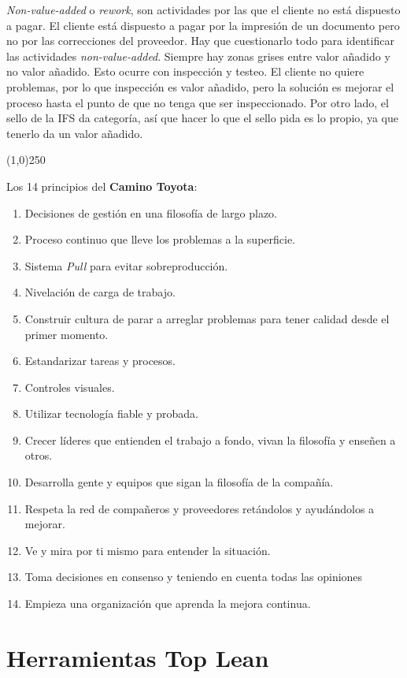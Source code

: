 \documentclass[oneside]{book}
\begin{document}
\textit{Non-value-added} o \textit{rework}, son actividades por las que el cliente no está dispuesto a pagar. El cliente está dispuesto a pagar por la impresión de un documento pero no por las correcciones del proveedor. Hay que cuestionarlo todo para identificar las actividades \textit{non-value-added}. Siempre hay zonas grises entre valor añadido y no valor añadido. Esto ocurre con inspección y testeo. El cliente no quiere problemas, por lo que inspección es valor añadido, pero la solución es mejorar el proceso hasta el punto de que no tenga que ser inspeccionado. Por otro lado, el sello de la IFS da categoría, así que hacer lo que el sello pida es lo propio, ya que tenerlo da un valor añadido.
\begin{center}
	\line(1,0){250}
\end{center}
Los 14 principios del \textbf{Camino Toyota}: \begin{enumerate} \item Decisiones de gestión en una filosofía de largo plazo. \item Proceso continuo que lleve los problemas a la superficie. \item Sistema \textit{Pull} para evitar sobreproducción. \item Nivelación de carga de trabajo. \item Construir cultura de parar a arreglar problemas para tener calidad desde el primer momento. \item Estandarizar tareas y procesos. \item Controles visuales. \item Utilizar tecnología fiable y probada. \item Crecer líderes que entienden el trabajo a fondo, vivan la filosofía y enseñen a otros. \item Desarrolla gente y equipos que sigan la filosofía de la compañía. \item Respeta la red de compañeros y proveedores retándolos y ayudándolos a mejorar. \item Ve y mira por ti mismo para entender la situación. \item Toma decisiones en consenso y teniendo en cuenta todas las opiniones \item Empieza una organización que aprenda la mejora continua. \end{enumerate}

\section{Herramientas Top Lean}
\end{document}
